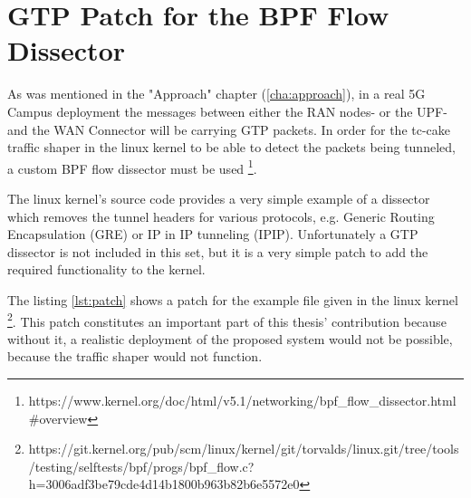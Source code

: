 

\cleardoublepage
\chapter{GTP Patch for the BPF Flow Dissector}
\label{appendix:patch}

As was mentioned in the "Approach" chapter (\ref{cha:approach}), in a real 5G Campus deployment the messages between either the RAN nodes- or the UPF- and the WAN Connector will be carrying GTP packets. In order for the tc-cake traffic shaper in the linux kernel to be able to detect the packets being tunneled, a custom BPF flow dissector must be used \footnote{https://www.kernel.org/doc/html/v5.1/networking/bpf\_flow\_dissector.html\#overview}.

The linux kernel's source code provides a very simple example of a dissector which removes the tunnel headers for various protocols, e.g. Generic Routing Encapsulation (GRE) or IP in IP tunneling (IPIP). Unfortunately a GTP dissector is not included in this set, but it is a very simple patch to add the required functionality to the kernel.

The listing \ref{lst:patch} shows a patch for the example file given in the linux kernel \footnote{https://git.kernel.org/pub/scm/linux/kernel/git/torvalds/linux.git/tree/tools/testing/selftests/bpf/progs/bpf\_flow.c?h=3006adf3be79cde4d14b1800b963b82b6e5572e0}. This patch constitutes an important part of this thesis' contribution because without it, a realistic deployment of the proposed system would not be possible, because the traffic shaper would not function.

\clearpage

